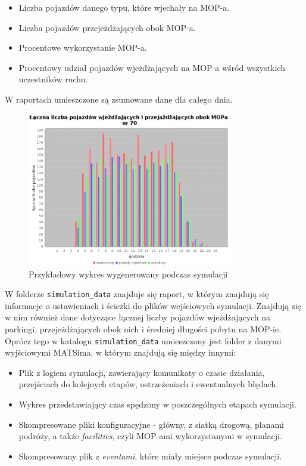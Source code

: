 \begin{itemize}
\item Liczba pojazdów danego typu, które wjechały na MOP-a.
\item Liczba pojazdów przejeżdżających obok MOP-a.
\item Procentowe wykorzystanie MOP-a.
\item Procentowy udział pojazdów wjeżdżających na MOP-a wśród wszystkich uczestników ruchu.
\end{itemize}
W raportach umieszczone są zsumowane dane dla całego dnia.
    \begin{figure}[h]
        \centering
        \caption{Przykładowy wykres wygenerowany podczas symulacji}
        \includegraphics[width=0.8\textwidth]{images/mopsim/passingVehicles.png}
    \end{figure}
W folderze \texttt{simulation\_data} znajduje się raport, w którym znajdują się informacje o ustawieniach i ścieżki do plików wejściowych symulacji. Znajdują się w nim również dane dotyczące łącznej liczby pojazdów wjeżdżających na parkingi, przejeżdżających obok nich i
średniej długości pobytu na MOP-ie. Oprócz tego w katalogu \texttt{simulation\_data} umieszczony jest folder z danymi wyjściowymi MATSima, w którym znajdują się między innymi:
\begin{itemize}
\item Plik z logiem symulacji, zawierający komunikaty o czasie działania, przejściach do kolejnych etapów, ostrzeżeniach i ewentualnych błędach.
\item Wykres przedstawiający czas spędzony w poszczególnych etapach symulacji.
\item Skompresowane pliki konfiguracyjne - główny, z siatką drogową, planami podróży, a także \textit{facilities}, czyli MOP-ami wykorzystanymi w symulacji.
\item Skompresowany plik z \textit{eventami}, które miały miejsce podczas symulacji.
\end{itemize}
